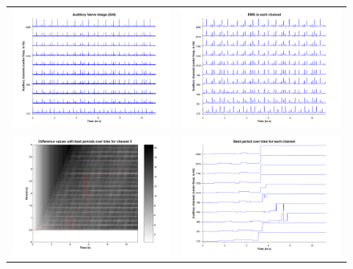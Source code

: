 \begin{figure}[p]
    \begin{tabular}{cc}
        \includegraphics[width=7.5cm]{Graphics/MECDemoPhotekTheLighteningANI} & \includegraphics[width=7.5cm]{Graphics/MECDemoPhotekTheLighteningANIRMS}\\
        \includegraphics[width=7.5cm]{Graphics/MECDemoPhotekTheLighteningValuesCh5} & \includegraphics[width=7.5cm]{Graphics/MECDemoPhotekTheLighteningBestPeriodsANI}\\

\end{tabular}
\end{figure}
